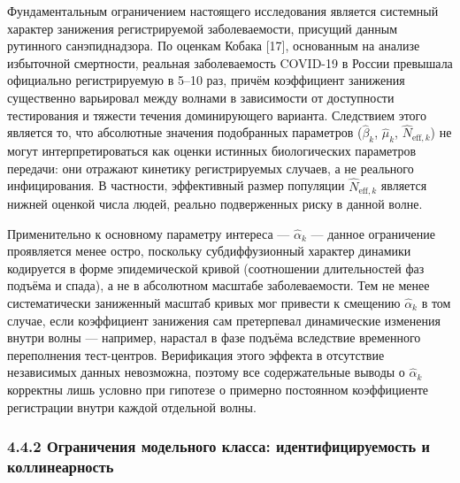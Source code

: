 \documentclass[12pt]{article}
\begin{document}
Фундаментальным ограничением настоящего исследования является системный
характер занижения регистрируемой заболеваемости, присущий данным
рутинного санэпиднадзора. По оценкам Кобака {[}17{]}, основанным на
анализе избыточной смертности, реальная заболеваемость COVID-19 в России
превышала официально регистрируемую в 5--10 раз, причём коэффициент
занижения существенно варьировал между волнами в зависимости от
доступности тестирования и тяжести течения доминирующего варианта.
Следствием этого является то, что абсолютные значения подобранных
параметров (\(\hat{\beta}_k\), \(\hat{\mu}_k\),
\(\hat{N}_{\text{eff},k}\)) не могут интерпретироваться как оценки
истинных биологических параметров передачи: они отражают кинетику
регистрируемых случаев, а не реального инфицирования. В частности,
эффективный размер популяции \(\hat{N}_{\text{eff},k}\) является нижней
оценкой числа людей, реально подверженных риску в данной волне.

Применительно к основному параметру интереса --- \(\hat{\alpha}_k\) ---
данное ограничение проявляется менее остро, поскольку субдиффузионный
характер динамики кодируется в форме эпидемической кривой (соотношении
длительностей фаз подъёма и спада), а не в абсолютном масштабе
заболеваемости. Тем не менее систематически заниженный масштаб кривых
мог привести к смещению \(\hat{\alpha}_k\) в том случае, если
коэффициент занижения сам претерпевал динамические изменения внутри
волны --- например, нарастал в фазе подъёма вследствие временного
переполнения тест-центров. Верификация этого эффекта в отсутствие
независимых данных невозможна, поэтому все содержательные выводы о
\(\hat{\alpha}_k\) корректны лишь условно при гипотезе о примерно
постоянном коэффициенте регистрации внутри каждой отдельной волны.

\subsubsection{4.4.2 Ограничения модельного класса: идентифицируемость и
коллинеарность}\label{ux43eux433ux440ux430ux43dux438ux447ux435ux43dux438ux44f-ux43cux43eux434ux435ux43bux44cux43dux43eux433ux43e-ux43aux43bux430ux441ux441ux430-ux438ux434ux435ux43dux442ux438ux444ux438ux446ux438ux440ux443ux435ux43cux43eux441ux442ux44c-ux438-ux43aux43eux43bux43bux438ux43dux435ux430ux440ux43dux43eux441ux442ux44c}
\end{document}
